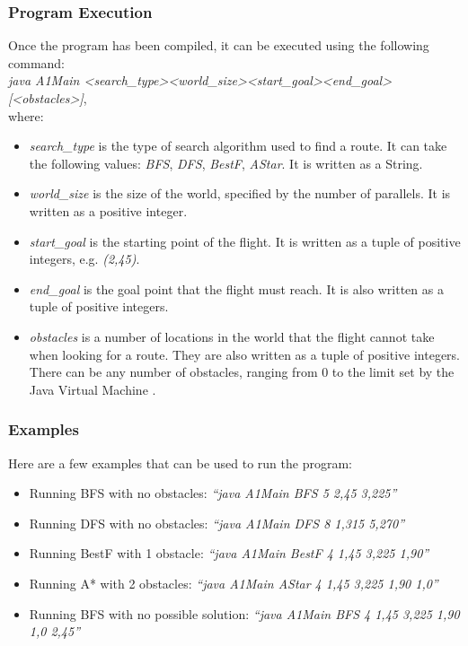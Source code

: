 \documentclass[letterpaper,12pt]{article}
\begin{document}
\subsubsection{Program Execution}

Once the program has been compiled, it can be executed using the following command:\\

\textit{java A1Main \textless search\_type\textgreater \textless world\_size\textgreater \textless start\_goal\textgreater \textless end\_goal\textgreater [\textless obstacles\textgreater]},\\

where:

\begin{itemize}
    \item \textit{search\_type} is the type of search algorithm used to find a route. It can take the following values: \textit{BFS}, \textit{DFS}, \textit{BestF}, \textit{AStar}. It is written as a String.
    \item \textit{world\_size} is the size of the world, specified by the number of parallels. It is written as a positive integer.
    \item \textit{start\_goal} is the starting point of the flight. It is written as a tuple of positive integers, e.g. \textit{(2,45)}.
    \item \textit{end\_goal} is the goal point that the flight must reach. It is also written as a tuple of positive integers.
    \item \textit{obstacles} is a number of locations in the world that the flight cannot take when looking for a route. They are also written as a tuple of positive integers. There can be any number of obstacles, ranging from 0 to the limit set by the Java Virtual Machine \cite{kabutz2017}.
\end{itemize}

\subsubsection{Examples}

Here are a few examples that can be used to run the program:

\begin{itemize}
    \item Running BFS with no obstacles: \textit{``java A1Main BFS 5 2,45 3,225''}
    \item Running DFS with no obstacles: \textit{``java A1Main DFS 8 1,315 5,270''}
    \item Running BestF with 1 obstacle: \textit{``java A1Main BestF 4 1,45 3,225 1,90''}
    \item Running A* with 2 obstacles: \textit{``java A1Main AStar 4 1,45 3,225 1,90 1,0''}
    \item Running BFS with no possible solution: \textit{``java A1Main BFS 4 1,45 3,225 1,90 1,0 2,45''}
\end{itemize}
\end{document}
